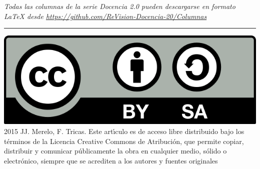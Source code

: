 \documentclass[twoside,10pt]{article}
\begin{document}
\begin{multicols}{2}
\bigskip

\noindent\emph{Todas las columnas de la serie Docencia 2.0
pueden descargarse en formato LaTeX desde
{\small\url{https://github.com/ReVision-Docencia-20/Columnas}}}

\noindent\rule{90mm}{1pt}

{\small \noindent\includegraphics[height = 4ex]{CC.png} 2015 JJ. Merelo, F. Tricas. Este art\'{\i}culo es de acceso libre distribuido bajo los t\'erminos
de la Licencia Creative Commons de Atribuci\'on, que permite copiar,
distribuir y comunicar p\'ublicamente la obra en cualquier medio, s\'olido
o electr\'onico, siempre que se acrediten a los autores y fuentes
originales}

\end{multicols}
\end{document}
